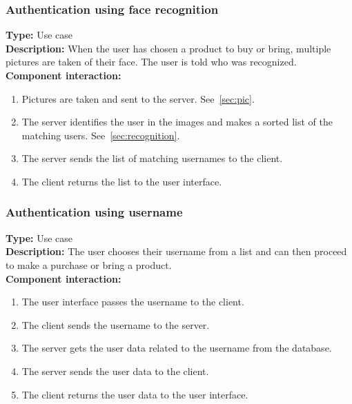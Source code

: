 \documentclass[11pt]{article}
\begin{document}
\subsubsection{Authentication using face recognition}
\textbf{Type:} Use case\\
\textbf{Description:} When the user has chosen a product to buy or bring, 
multiple pictures are taken of their face. The user is told who was recognized. \\
\textbf{Component interaction:} 
\begin{enumerate} 
\item{Pictures are taken and sent to the server. See~\ref{sec:pic}.}
\item{The server identifies the user in the images and makes a sorted list of the matching users. See~\ref{sec:recognition}.}
\item{The server sends the list of matching usernames to the client.}
\item{The client returns the list to the user interface.}
\end{enumerate}

\subsubsection{Authentication using username}
\textbf{Type:} Use case\\
\textbf{Description:} The user chooses their username from a list and can then proceed to make a purchase or bring a product.\\
\textbf{Component interaction:} 
\begin{enumerate} 
\item{The user interface passes the username to the client.}
\item{The client sends the username to the server.}
\item{The server gets the user data related to the username from the database.}
\item{The server sends the user data to the client.}
\item{The client returns the user data to the user interface.}
\end{enumerate}
\end{document}
